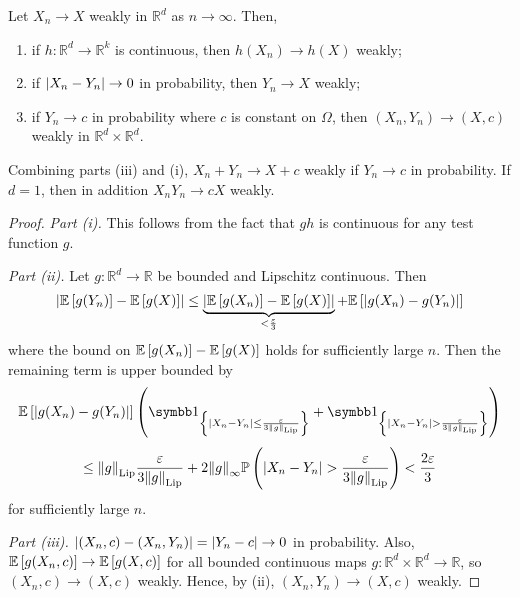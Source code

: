 \begin{proposition}
	Let \( X_n \to X \) weakly in \( \mathbb R^d \) as \( n \to \infty \).
	Then,
	\begin{enumerate}
		\item if \( h \colon \mathbb R^d \to \mathbb R^k \) is continuous, then \( h(X_n) \to h(X) \) weakly;
		\item if \( \abs{X_n - Y_n} \to 0 \) in probability, then \( Y_n \to X \) weakly;
		\item if \( Y_n \to c \) in probability where \( c \) is constant on \( \Omega \), then \( (X_n, Y_n) \to (X, c) \) weakly in \( \mathbb R^d \times \mathbb R^d \).
	\end{enumerate}
\end{proposition}
\begin{remark}
	Combining parts (iii) and (i), \( X_n + Y_n \to X + c \) weakly if \( Y_n \to c \) in probability.
	If \( d = 1 \), then in addition \( X_n Y_n \to c X \) weakly.
\end{remark}
\begin{proof}
	\emph{Part (i).}
	This follows from the fact that \( gh \) is continuous for any test function \( g \).

	\emph{Part (ii).}
	Let \( g \colon \mathbb R^d \to \mathbb R \) be bounded and Lipschitz continuous.
	Then
	\[ \abs{\mathbb{E}\left[{g(Y_n)}\right] - \mathbb{E}\left[{g(X)}\right]} \leq \underbrace{\abs{\mathbb{E}\left[{g(X_n)}\right] - \mathbb{E}\left[{g(X)}\right]}}_{< \frac{\varepsilon}{3}} + \mathbb{E}\left[{\abs{g(X_n) - g(Y_n)}}\right] \]
	where the bound on \( \mathbb{E}\left[{g(X_n)}\right] - \mathbb{E}\left[{g(X)}\right] \) holds for sufficiently large \( n \).
	Then the remaining term is upper bounded by
	\[ \expect{\abs{g(X_n) - g(Y_n)}} \qty(\symbb 1_{\qty{\abs{X_n - Y_n} \leq \frac{\varepsilon}{3\norm{g}_{\mathrm{Lip}}}}} + \symbb 1_{\qty{\abs{X_n - Y_n} > \frac{\varepsilon}{3\norm{g}_{\mathrm{Lip}}}}} ) \]
	\[ \leq \norm{g}_{\mathrm{Lip}} \frac{\varepsilon}{3\norm{g}_{\mathrm{Lip}}} + 2\norm{g}_\infty \mathbb{P}\left({\abs{X_n - Y_n} > \frac{\varepsilon}{3\norm{g}_{\mathrm{Lip}}}}\right) < \frac{2\varepsilon}{3} \]
	for sufficiently large \( n \).

	\emph{Part (iii).}
	\( \abs{(X_n, c) - (X_n, Y_n)} = \abs{Y_n - c} \to 0 \) in probability.
	Also, \( \mathbb{E}\left[{g(X_n, c)}\right] \to \mathbb{E}\left[{g(X, c)}\right] \) for all bounded continuous maps \( g \colon \mathbb R^d \times \mathbb R^d \to \mathbb R \), so \( (X_n, c) \to (X, c) \) weakly.
	Hence, by (ii), \( (X_n, Y_n) \to (X, c) \) weakly.
\end{proof}
